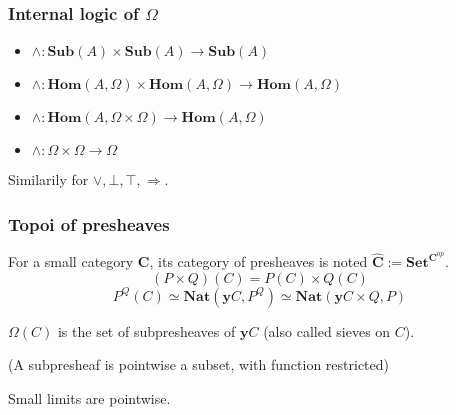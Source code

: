 \documentclass{beamer}
\newcommand{\0}{\boldsymbol{0}}
\newcommand{\1}{\boldsymbol{1}}
\begin{document}
\begin{frame}
    \frametitle{Internal logic of $\Omega$}

    \begin{itemize}
        \item $\land : \mathbf{Sub}(A)\times \mathbf{Sub}(A) \to \mathbf{Sub}(A)$
        \item $\land : \mathbf{Hom}(A,\Omega)\times \mathbf{Hom}(A,\Omega)\to \mathbf{Hom}(A,\Omega)$
        \item $\land : \mathbf{Hom}(A,\Omega\times \Omega)\to\mathbf{Hom}(A,\Omega)$
        \item $\land : \Omega\times\Omega \to\Omega$
    \end{itemize}

    Similarily for $\lor,\bot,\top,\Rightarrow$.
\end{frame}

\begin{frame}
    \frametitle{Topoi of presheaves}
    For a small category $\textbf{C}$, its category of presheaves is noted $\widehat{\textbf{C}} := \mathbf{Set}^{\textbf{C}^{op}}$.
    $$ (P\times Q) (C) = P(C)\times Q(C)$$
    $$P^Q(C) \simeq \mathbf{Nat}(\mathbf{y}C,P^Q)\simeq \mathbf{Nat}(\mathbf{y}C \times Q, P)$$
    \vspace{0cm}

    \centering $\Omega(C)$ is the set of subpresheaves of $\mathbf{y}C$ (also called sieves on $C$).

    \centering (A subpresheaf is pointwise a subset, with function restricted)

    \vspace{0.5cm}
    Small limits are pointwise.
\end{frame}
\end{document}
